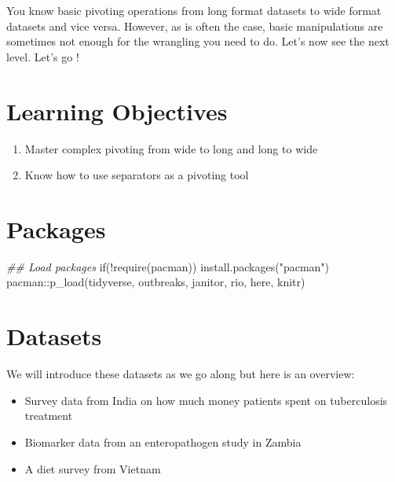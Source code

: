 \documentclass[
  letterpaper,
  DIV=11,
  numbers=noendperiod]{scrreprt}
\newenvironment{Shaded}{\begin{snugshade}}{\end{snugshade}}
\newcommand{\ControlFlowTok}[1]{\textcolor[rgb]{0.00,0.23,0.31}{#1}}
\newcommand{\DocumentationTok}[1]{\textcolor[rgb]{0.37,0.37,0.37}{\textit{#1}}}
\newcommand{\FunctionTok}[1]{\textcolor[rgb]{0.28,0.35,0.67}{#1}}
\newcommand{\NormalTok}[1]{\textcolor[rgb]{0.00,0.23,0.31}{#1}}
\newcommand{\SpecialCharTok}[1]{\textcolor[rgb]{0.37,0.37,0.37}{#1}}
\newcommand{\StringTok}[1]{\textcolor[rgb]{0.13,0.47,0.30}{#1}}
\begin{document}
You know basic pivoting operations from long format datasets to wide
format datasets and vice versa. However, as is often the case, basic
manipulations are sometimes not enough for the wrangling you need to do.
Let's now see the next level. Let's go !

\hypertarget{learning-objectives-13}{%
\section{Learning Objectives}\label{learning-objectives-13}}

\begin{enumerate}
\def\labelenumi{\arabic{enumi}.}
\item
  Master complex pivoting from wide to long and long to wide
\item
  Know how to use separators as a pivoting tool
\end{enumerate}

\hypertarget{packages-8}{%
\section{Packages}\label{packages-8}}

\begin{Shaded}
\begin{Highlighting}[]
\DocumentationTok{\#\# Load packages }
\ControlFlowTok{if}\NormalTok{(}\SpecialCharTok{!}\FunctionTok{require}\NormalTok{(pacman)) }\FunctionTok{install.packages}\NormalTok{(}\StringTok{"pacman"}\NormalTok{)}
\NormalTok{pacman}\SpecialCharTok{::}\FunctionTok{p\_load}\NormalTok{(tidyverse, outbreaks, janitor, rio, here, knitr)}
\end{Highlighting}
\end{Shaded}

\hypertarget{datasets-3}{%
\section{Datasets}\label{datasets-3}}

We will introduce these datasets as we go along but here is an overview:

\begin{itemize}
\item
  Survey data from India on how much money patients spent on
  tuberculosis treatment
\item
  Biomarker data from an enteropathogen study in Zambia
\item
  A diet survey from Vietnam
\end{itemize}
\end{document}
